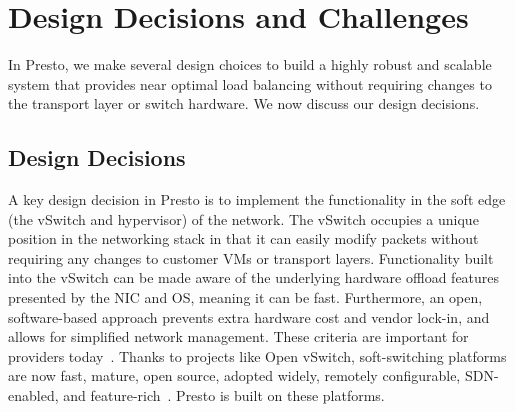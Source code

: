\section{Design Decisions and Challenges}
\label{sec:background}

In Presto, we make several design choices to 
build a highly robust and scalable system that provides near optimal load 
balancing without requiring changes to the transport layer or switch hardware. We 
now discuss our design decisions.


\subsection{Design Decisions}

 A key design decision in Presto 
is to implement the functionality in the soft edge (\ie{}the vSwitch and hypervisor) of 
the network. 
The vSwitch occupies a unique position in the networking stack 
in that it can easily modify packets without requiring any changes to customer VMs or transport layers.
Functionality built into the vSwitch can be made aware of the underlying hardware offload
features presented by the NIC and OS, meaning it can be fast.
Furthermore, an open, software-based approach prevents extra hardware cost and vendor 
lock-in, and allows for simplified network management. 
These criteria are important for providers today~\cite{aws-peek}.
Thanks to projects like Open vSwitch, 
soft-switching platforms are now fast, mature, open source, adopted widely, remotely 
configurable, SDN-enabled, and feature-rich~\cite{ovs-edge,nv-mtd,pfaff2015design}. Presto is built on these 
platforms.

